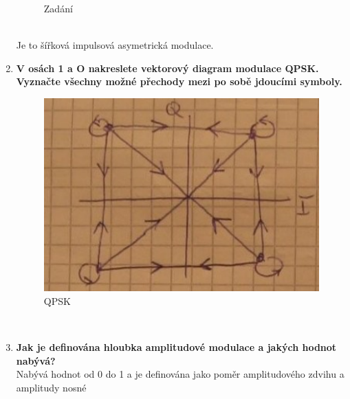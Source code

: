 \begin{enumerate}
\begin{figure}[h]
        \caption{Zadání}
    \end{figure}\\
    Je to šířková impulsová asymetrická modulace.
    \item \textbf{V osách 1 a O nakreslete vektorový diagram modulace QPSK. Vyznačte všechny možné
    přechody mezi po sobě jdoucími symboly.}
    \begin{figure}[h]
        \centering
        \includegraphics[scale = 0.5]{images/QPSKMal.png}
        \caption{QPSK}
    \end{figure}\\
    \item \textbf{Jak je definována hloubka amplitudové modulace a jakých hodnot nabývá?}\\
    Nabývá hodnot od 0 do 1 a je definována jako poměr amplitudového zdvihu a amplitudy nosné
\end{enumerate}